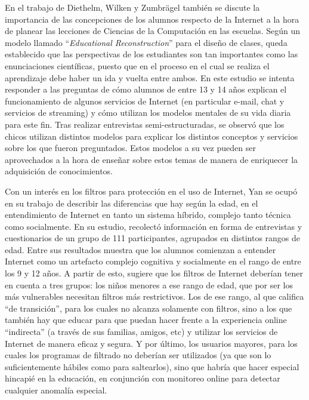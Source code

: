En el trabajo de Diethelm, Wilken y Zumbrägel \cite{diethelm} también se discute la importancia de las concepciones de los alumnos respecto de la Internet a la hora de planear las lecciones de Ciencias de la Computación en las escuelas. Según un modelo llamado ``\textit{Educational Reconstruction}'' \cite{komorek} para el diseño de clases, queda establecido que las perspectivas de los estudiantes son tan importantes como las enunciaciones científicas, puesto que en el proceso en el cual se realiza el aprendizaje debe haber un ida y vuelta entre ambos. En este estudio se intenta responder a las preguntas de cómo alumnos de entre 13 y 14 años explican el funcionamiento de algunos servicios de Internet (en particular e-mail, chat y servicios de streaming) y cómo utilizan los modelos mentales de su vida diaria para este fin. Tras realizar entrevistas semi-estructuradas, se observó que los chicos utilizan distintos modelos para explicar los distintos conceptos y servicios sobre los que fueron preguntados. Estos modelos a su vez pueden ser aprovechados a la hora de enseñar sobre estos temas de manera de enriquecer la adquisición de conocimientos.	
				
Con un interés en los filtros para protección en el uso de Internet, Yan \cite{yan} se ocupó en su trabajo de describir las diferencias que hay según la edad, en el entendimiento de Internet en tanto un sistema híbrido, complejo tanto técnica como socialmente. En su estudio, recolectó información en forma de entrevistas y cuestionarios de un grupo de 111 participantes, agrupados en distintos rangos de edad. Entre sus resultados muestra que los alumnos comienzan a entender Internet como un artefacto complejo cognitiva y socialmente en el rango de entre los 9 y 12 años. A partir de esto, sugiere que los filtros de Internet deberían tener en cuenta a tres grupos: los niños menores a ese rango de edad, que por ser los más vulnerables necesitan filtros más restrictivos. Los de ese rango, al que califica “de transición”, para los cuales no alcanza solamente con filtros, sino a los que también hay que educar para que puedan hacer frente a la experiencia online “indirecta” (a través de sus familias, amigos, etc) y utilizar los servicios de Internet de manera eficaz y segura. Y por último, los usuarios mayores, para los cuales los programas de filtrado no deberían ser utilizados (ya que son lo suficientemente hábiles como para saltearlos), sino que habría que hacer especial hincapié en la educación, en conjunción con monitoreo online para detectar cualquier anomalía especial. 

